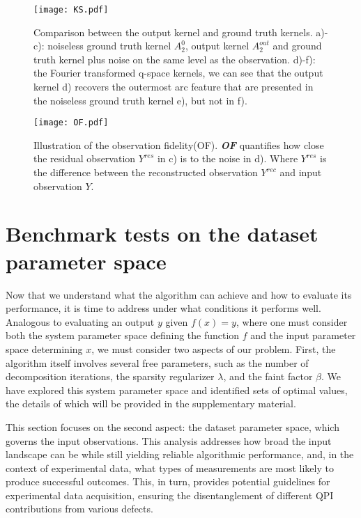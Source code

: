 \begin{figure}
	\texttt{[image: KS.pdf]} 
	\centering
	\caption{Comparison between the output kernel and ground truth kernels. a)-c): noiseless ground truth kernel $A_2^0$, output kernel $A_2^{out}$ and ground truth kernel plus noise on the same level as the observation. d)-f): the Fourier transformed q-space kernels, we can see that the output kernel d) recovers the outermost arc feature that are presented in the noiseless ground truth kernel e), but not in f).}
	\label{fig:KS}
\end{figure}

\begin{figure}
	\texttt{[image: OF.pdf]} 
	\centering
	\caption{Illustration of the observation fidelity(OF). \textbf{\textit{OF}} quantifies how close the residual observation $Y^{res}$ in c) is to the noise in d). Where $Y^{res}$ is the difference between the reconstructed observation $Y^{rec}$ and input observation $Y$.}
	\label{fig:OF}
\end{figure}


\section{Benchmark tests on the dataset parameter space}
Now that we understand what the algorithm can achieve and how to evaluate its performance, it is time to address under what conditions it performs well. Analogous to evaluating an output $y$ given $f(x)=y$, where one must consider both the system parameter space defining the function $f$ and the input parameter space determining $x$, we must consider two aspects of our problem. First, the algorithm itself involves several free parameters, such as the number of decomposition iterations, the sparsity regularizer $\lambda$, and the faint factor $\beta$. We have explored this system parameter space and identified sets of optimal values, the details of which will be provided in the supplementary material.

This section focuses on the second aspect: the dataset parameter space, which governs the input observations. This analysis addresses how broad the input landscape can be while still yielding reliable algorithmic performance, and, in the context of experimental data, what types of measurements are most likely to produce successful outcomes. This, in turn, provides potential guidelines for experimental data acquisition, ensuring the disentanglement of different \ac{QPI} contributions from various defects.

